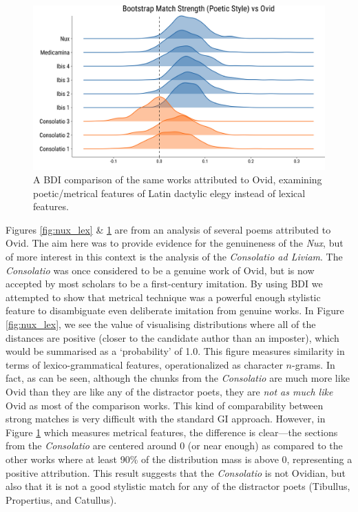 \documentclass[
    hf
]{ceurart}
\begin{document}
\begin{figure}
    \includegraphics[width=\linewidth]{figures/bootstrap_poetics_paper.png}
    \caption{A BDI comparison of the same works attributed to Ovid, examining
        poetic/metrical features of Latin dactylic elegy instead of lexical
        features.}
    \label{fig:nux_poet}
\end{figure}

Figures \ref{fig:nux_lex} \& \ref{fig:nux_poet} are from an analysis of several poems attributed to
Ovid. The aim here was to provide evidence for the genuineness of the \emph{Nux}, but of more
interest in this context is the analysis of the \emph{Consolatio ad Liviam}. The \emph{Consolatio}
was once considered to be a genuine work of Ovid, but is now accepted by most scholars to be a
first-century imitation. By using BDI we attempted to show that metrical technique was a powerful
enough stylistic feature to disambiguate even deliberate imitation from genuine works. In Figure
\ref{fig:nux_lex}, we see the value of visualising distributions where all of the distances are
positive (closer to the candidate author than an imposter), which would be summarised as a
`probability' of 1.0. This figure measures similarity in terms of lexico-grammatical features,
operationalized as character $n$-grams. In fact, as can be seen, although the chunks from the
\emph{Consolatio} are much more like Ovid than they are like any of the distractor poets, they are
\emph{not as much like} Ovid as most of the comparison works. This kind of comparability between
strong matches is very difficult with the standard GI approach. However, in Figure
\ref{fig:nux_poet} which measures metrical features, the difference is clear---the sections from the
\emph{Consolatio} are centered around 0 (or near enough) as compared to the other works where at
least 90\% of the distribution mass is above 0, representing a positive attribution. This result
suggests that the \emph{Consolatio} is not Ovidian, but also that it is not a good stylistic match
for any of the distractor poets (Tibullus, Propertius, and Catullus).
\end{document}
